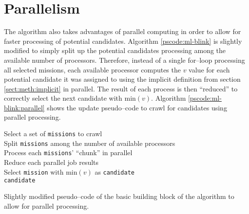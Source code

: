 \section{Parallelism} \label{sect:meth:parallelism}

The \mlblink algorithm also takes advantages of parallel computing in order to allow for faster processing of potential candidates. Algorithm \ref{pscode:ml-blink} is slightly modified to simply split up the potential candidates processing among the available number of processors. Therefore, instead of a single for--loop processing all selected missions, each available processor computes the $v$ value for each potential candidate it was assigned to using the implicit definition from section \ref{sect:meth:implicit} in parallel. The result of each process is then ``reduced'' to correctly select the next candidate with $\text{min}(v)$. Algorithm \ref{pscode:ml-blink:parallel} shows the update pseudo--code to crawl for candidates using parallel processing.

\vspace{0.4cm}
\begin{algorithm}[H]
    \SetAlgoLined
        \FMain{} {
             {
                Select a set of \texttt{missions} to crawl \\
                Split \texttt{missions} among the number of available processors \\
                Process each \texttt{missions}' ``chunk'' in parallel \\
                Reduce each parallel job results \\
                Select \texttt{mission} with $\text{min}(v)$ as \texttt{candidate} \\
                \Return \texttt{candidate}
            }
        }
    \caption{Slightly modified pseudo--code of the basic building block of the \mlblink algorithm to allow for parallel processing.}
    \label{pscode:ml-blink:parallel}
\end{algorithm}
\vspace{0.4cm}